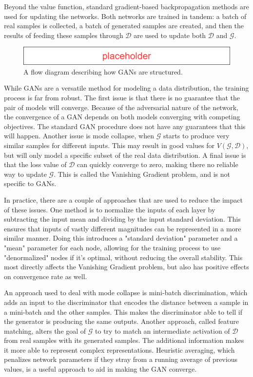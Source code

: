 	\par Beyond the value function, standard gradient-based backpropagation methods are used for updating the networks. Both networks are trained in tandem: a batch of real samples is collected, a batch of generated samples are created, and then the results of feeding these samples through $\mathcal{D}$ are used to update both $\mathcal{D}$ and $\mathcal{G}$.  
	\begin{figure}
		\centering
		\caption{A flow diagram describing how GANs are structured.}
		\label{fig:GanFlowDiagram}
		\includegraphics[scale=0.5]{figures/Placeholder.png}
	\end{figure}
	\par While GANs are a versatile method for modeling a data distribution, the training process is far from robust. The first issue is that there is no guarantee that the pair of models will converge. Because of the adversarial nature of the network, the convergence of a GAN  depends on both models converging with competing objectives. The standard GAN procedure does not have any guarantees that this will happen. Another issue is mode collapse, when $\mathcal{G}$ starts to produce very similar samples for different inputs. This may result in good values for $V(\mathcal{G},\mathcal{D})$, but will only model a specific subset of the real data distribution. A final issue is that the loss value of $\mathcal{D}$ can quickly converge to zero, making there no reliable way to update $\mathcal{G}$. This is called the Vanishing Gradient problem, and is not specific to GANs. 
	\par In practice, there are a couple of approaches that are used to reduce the impact of these issues. One method is to normalize the inputs of each layer by subtracting the input mean and dividing by the input standard deviation. This ensures that inputs of vastly different magnitudes can be represented in a more similar manner. Doing this introduces a "standard deviation" parameter and a "mean" parameter for each node, allowing for the training process to use "denormalized" nodes if it's optimal, without reducing the overall stability. This most directly affects the Vanishing Gradient problem, but also has positive effects on convergence rate as well.
	\par An approach used to deal with mode collapse is mini-batch discrimination, which adds an input to the discriminator that encodes the distance between a sample in a mini-batch and the other samples. This makes the discriminator able to tell if the generator is producing the same outputs. Another approach, called feature matching, alters the goal of $\mathcal{G}$ to try to match an intermediate activation of $\mathcal{D}$ from real samples with its generated samples. The additional information makes it more able to represent complex representations. Heuristic averaging, which penalizes network parameters if they stray from a running average of previous values, is a useful approach to aid in making the GAN converge. 
